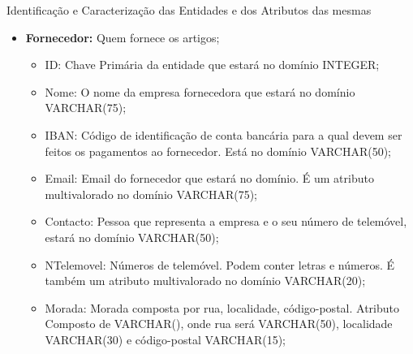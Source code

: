 \documentclass[compress,svgnames,handout,13.7pt]{beamer}
\begin{document}
\begin{frame}{Identificação e Caracterização das Entidades e dos Atributos das mesmas}
\begin{itemize}
                 \item{\textbf{Fornecedor:}} Quem fornece os artigos;
                     \begin{itemize}
                     \item{ID:} Chave Primária da entidade que estará no domínio INTEGER;
                       
                     \item{Nome:} O nome da empresa fornecedora que estará no domínio VARCHAR(75);
                       
                     \item{IBAN:} Código de identificação de conta bancária para a qual devem ser feitos os pagamentos ao fornecedor. Está no domínio VARCHAR(50);
                       
                     \item{Email:} Email do fornecedor que estará no domínio. É um atributo multivalorado no domínio VARCHAR(75);
                       
                     \item{Contacto:} Pessoa que representa a empresa e o seu número de telemóvel, estará no domínio VARCHAR(50);
                       
                     \item{NTelemovel:} Números de telemóvel. Podem conter letras e números. É também um atributo multivalorado no domínio VARCHAR(20);
                       
                     \item{Morada:} Morada composta por rua, localidade, código-postal. Atributo Composto de VARCHAR(), onde rua será VARCHAR(50), localidade VARCHAR(30) e código-postal VARCHAR(15);
                       
                     \end{itemize}
\end{itemize}
\end{frame}
\end{document}
